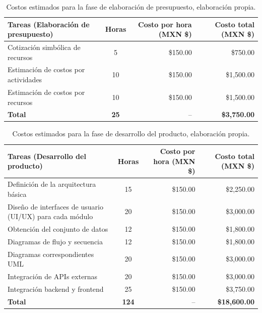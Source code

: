 \begin{table}[H]
	\centering
	\renewcommand{\arraystretch}{1.6}
	\setlength{\tabcolsep}{10pt}
	\Huge
	\begin{adjustbox}{max width=\textwidth}
		\begin{tabular}{|p{9.5cm}|c|r|r|}
			\hline
			\textbf{Tareas (Elaboración de presupuesto)} & \textbf{Horas} & \textbf{Costo por hora (MXN \$)} & \textbf{Costo total (MXN \$)} \\ \hline
			Cotización simbólica de recursos & 5 & \$150.00 & \$750.00 \\ \hline
			Estimación de costos por actividades & 10 & \$150.00 & \$1,500.00 \\ \hline
			Estimación de costos por recursos & 10 & \$150.00 & \$1,500.00 \\ \hline
			\textbf{Total} & \textbf{25} & -- & \textbf{\$3,750.00} \\ \hline
		\end{tabular}
	\end{adjustbox}
	\caption[Costos estimados para la fase de elaboración de presupuesto]{Costos estimados para la fase de elaboración de presupuesto, elaboración propia.} 	
	\label{tab:costos_presupuesto_nuevo}
\end{table}

\begin{table}[H]
	\centering
	\renewcommand{\arraystretch}{1.6}
	\setlength{\tabcolsep}{10pt}
	\Huge
	\begin{adjustbox}{max width=\textwidth}
		\begin{tabular}{|p{9.5cm}|c|r|r|}
			\hline
			\textbf{Tareas (Desarrollo del producto)} & \textbf{Horas} & \textbf{Costo por hora (MXN \$)} & \textbf{Costo total (MXN \$)} \\ \hline
			Definición de la arquitectura básica & 15 & \$150.00 & \$2,250.00 \\ \hline
			Diseño de interfaces de usuario (UI/UX) para cada módulo & 20 & \$150.00 & \$3,000.00 \\ \hline
			Obtención del conjunto de datos & 12 & \$150.00 & \$1,800.00 \\ \hline
			Diagramas de flujo y secuencia & 12 & \$150.00 & \$1,800.00 \\ \hline
			Diagramas correspondientes UML & 20 & \$150.00 & \$3,000.00 \\ \hline
			Integración de APIs externas & 20 & \$150.00 & \$3,000.00 \\ \hline
			Integración backend y frontend & 25 & \$150.00 & \$3,750.00 \\ \hline
			\textbf{Total} & \textbf{124} & -- & \textbf{\$18,600.00} \\ \hline
		\end{tabular}
	\end{adjustbox}
	\caption[Costos estimados para la fase de desarrollo del producto]{Costos estimados para la fase de desarrollo del producto, elaboración propia.} 	
	\label{tab:costos_desarrollo_nuevo}
\end{table}



